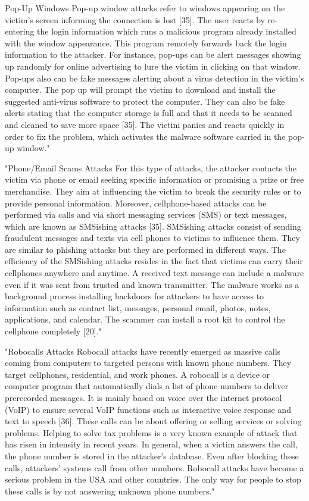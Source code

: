 Pop-Up Windows
Pop-up window attacks refer to windows appearing on the victim’s screen informing the connection is lost [35]. The user reacts by re-entering the login information
which runs a malicious program already installed with the window appearance. This program remotely forwards back the login information to the attacker. For instance,
pop-ups can be alert messages showing up randomly for online advertising to lure the victim in clicking on that window. Pop-ups also can be fake messages alerting about
a virus detection in the victim’s computer. The pop up will prompt the victim to download and install the suggested anti-virus software to protect the computer. They can
also be fake alerts stating that the computer storage is full and that it needs to be scanned and cleaned to save more space [35]. The victim panics and reacts quickly in
order to fix the problem, which activates the malware software carried in the pop-up window."\cite{4_mdpi}

"Phone/Email Scams Attacks
For this type of attacks, the attacker contacts the victim via phone or email seeking specific information or promising a prize or free merchandise.
They aim at influencing the victim to break the security rules or to provide personal information. Moreover, cellphone-based attacks can be performed
via calls and via short messaging services (SMS) or text messages, which are known as SMSishing attacks [35]. SMSishing attacks consist of sending fraudulent
messages and texts via cell phones to victims to influence them. They are similar to phishing attacks but they are performed in different ways. The efficiency of
the SMSishing attacks resides in the fact that victims can carry their cellphones anywhere and anytime. A received text message can include a malware even if it was
sent from trusted and known transmitter. The malware works as a background process installing backdoors for attackers to have access to information such as contact list,
messages, personal email, photos, notes, applications, and calendar. The scammer can install a root kit to control the cellphone completely [20]."\cite{4_mdpi}

"Robocalls Attacks
Robocall attacks have recently emerged as massive calls coming from computers to targeted persons with known phone numbers. They target cellphones, residential,
and work phones. A robocall is a device or computer program that automatically dials a list of phone numbers to deliver prerecorded messages. It is mainly based on
voice over the internet protocol (VoIP) to ensure several VoIP functions such as interactive voice response and text to speech [36]. These calls can be about offering
or selling services or solving problems. Helping to solve tax problems is a very known example of attack that has risen in intensity in recent years. In general, when
a victim answers the call, the phone number is stored in the attacker’s database. Even after blocking these calls, attackers’ systems call from other numbers. Robocall
attacks have become a serious problem in the USA and other countries. The only way for people to stop these calls is by not answering unknown phone numbers."\cite{4_mdpi}

